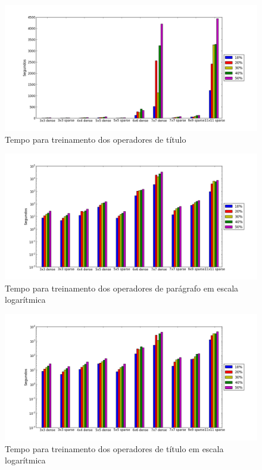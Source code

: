 \documentclass[a4paper,11pt]{article}
\begin{document}
  \begin{figure}[p]
    \centerline{\includegraphics[width=1.2\textwidth]{assets/experiment_charts/TextRegion_heading_time.png}}
    \caption{Tempo para treinamento dos operadores de título}
    \label{fig:heading_build_time}
  \end{figure}

  \begin{figure}[p]
    \centerline{\includegraphics[width=1.2\textwidth]{assets/experiment_charts/TextRegion_paragraph_time_log.png}}
    \caption{Tempo para treinamento dos operadores de parágrafo em escala logarítmica}
    \label{fig:paragraph_build_time_log}
  \end{figure}

  \begin{figure}[p]
    \centerline{\includegraphics[width=1.2\textwidth]{assets/experiment_charts/TextRegion_heading_time_log.png}}
    \caption{Tempo para treinamento dos operadores de título em escala logarítmica}
    \label{fig:heading_build_time_log}
  \end{figure}
\end{document}
